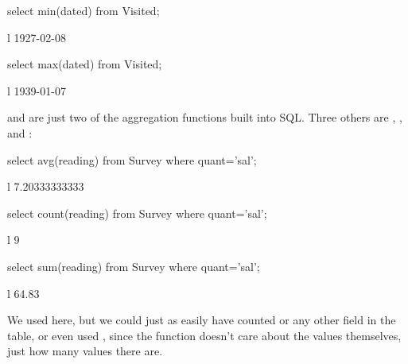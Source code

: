 \begin{VerbIn}
select min(dated) from Visited;
\end{VerbIn}

\begin{sqltable}{l}
1927-02-08 \\
\end{sqltable}


\begin{VerbIn}
select max(dated) from Visited;
\end{VerbIn}

\begin{sqltable}{l}
1939-01-07 \\
\end{sqltable}

 and  are just two of the aggregation functions
built into SQL. Three others are , , and
:

\begin{VerbIn}
select avg(reading) from Survey where quant='sal';
\end{VerbIn}

\begin{sqltable}{l}
7.20333333333 \\
\end{sqltable}

\begin{VerbIn}
select count(reading) from Survey where quant='sal';
\end{VerbIn}

\begin{sqltable}{l}
9 \\
\end{sqltable}

\begin{VerbIn}
select sum(reading) from Survey where quant='sal';
\end{VerbIn}

\begin{sqltable}{l}
64.83 \\
\end{sqltable}

We used  here, but we could just as easily have
counted  or any other field in the table, or even used
, since the function doesn't care about the values
themselves, just how many values there are.

